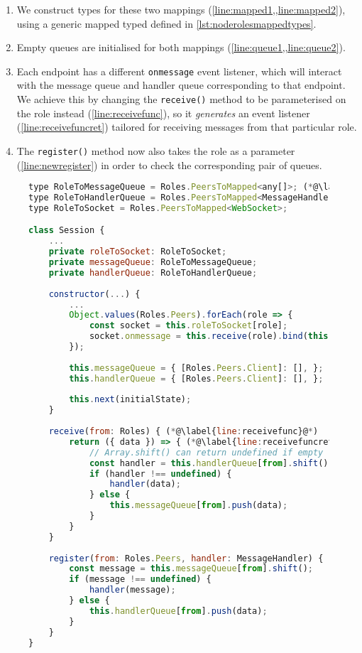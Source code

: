 \begin{enumerate}
\item We construct types for these two mappings 
(\cref{line:mapped1,,line:mapped2}), 
using a generic mapped typed defined in
\cref{lst:noderolesmappedtypes}.

\item Empty queues are initialised for both mappings
(\cref{line:queue1,,line:queue2}).

\item Each endpoint has a different \texttt{onmessage}
event listener, which will interact with the message queue
and handler queue corresponding to that endpoint. 
We achieve this by changing the \texttt{receive()} method
to be parameterised on the role instead 
(\cref{line:receivefunc}),
so it \textit{generates} an event listener 
(\cref{line:receivefuncret})
tailored for receiving messages
from that particular role.

\item
The \texttt{register()} method now also takes the role
as a parameter (\cref{line:newregister}) in order to check the 
corresponding pair of queues.
\end{enumerate}

\begin{figure}[!h]
\begin{lstlisting}[language=javascript,tabsize=2]
type RoleToMessageQueue = Roles.PeersToMapped<any[]>; (*@\label{line:mapped1}@*)
type RoleToHandlerQueue = Roles.PeersToMapped<MessageHandler[]>; (*@\label{line:mapped2}@*)
type RoleToSocket = Roles.PeersToMapped<WebSocket>;

class Session {
	...
	private roleToSocket: RoleToSocket;
	private messageQueue: RoleToMessageQueue;
	private handlerQueue: RoleToHandlerQueue;
	
	constructor(...) {
		...
		Object.values(Roles.Peers).forEach(role => {
			const socket = this.roleToSocket[role];
			socket.onmessage = this.receive(role).bind(this);
		});
		
		this.messageQueue = { [Roles.Peers.Client]: [], }; (*@\label{line:queue1}@*)
		this.handlerQueue = { [Roles.Peers.Client]: [], }; (*@\label{line:queue2}@*)
		
		this.next(initialState);	
	}
	
	receive(from: Roles) { (*@\label{line:receivefunc}@*)
		return ({ data }) => { (*@\label{line:receivefuncret}@*)
			// Array.shift() can return undefined if empty
			const handler = this.handlerQueue[from].shift();
			if (handler !== undefined) {
				handler(data);
			} else {
				this.messageQueue[from].push(data);			
			}
		}
	}
	
	register(from: Roles.Peers, handler: MessageHandler) { (*@\label{line:newregister}@*)
		const message = this.messageQueue[from].shift();
		if (message !== undefined) {
			handler(message);		
		} else {
			this.handlerQueue[from].push(data);		
		}
	}
}
\end{lstlisting}
\label{lst:nodesession}
\end{figure}


